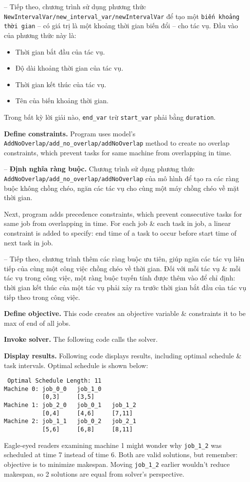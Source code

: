 \documentclass{article}
\begin{document}
-- Tiếp theo, chương trình sử dụng phương thức \verb|NewIntervalVar/new_interval_var/newIntervalVar| để tạo một {\tt biến khoảng thời gian} -- có giá trị là một khoảng thời gian biến đổi -- cho tác vụ. Đầu vào của phương thức này là:
\begin{itemize}
    \item Thời gian bắt đầu của tác vụ.
    \item Độ dài khoảng thời gian của tác vụ.
    \item Thời gian kết thúc của tác vụ.
    \item Tên của biến khoảng thời gian.
\end{itemize}
Trong bất kỳ lời giải nào, \verb|end_var| trừ \verb|start_var| phải bằng {\tt duration}.

{\bf Define constraints.} Program uses model's \verb|AddNoOverlap/add_no_overlap/addNoOverlap| method to create no overlap constraints, which prevent tasks for same machine from overlapping in time.

-- {\bf Định nghĩa ràng buộc.} Chương trình sử dụng phương thức \verb|AddNoOverlap/add_no_overlap/addNoOverlap| của mô hình để tạo ra các ràng buộc không chồng chéo, ngăn các tác vụ cho cùng một máy chồng chéo về mặt thời gian.

Next, program adds precedence constraints, which prevent consecutive tasks for same job from overlapping in time. For each job \& each task in job, a linear constraint is added to specify: end time of a task to occur before start time of next task in job.

-- Tiếp theo, chương trình thêm các ràng buộc ưu tiên, giúp ngăn các tác vụ liên tiếp của cùng một công việc chồng chéo về thời gian. Đối với mỗi tác vụ \& mỗi tác vụ trong công việc, một ràng buộc tuyến tính được thêm vào để chỉ định: thời gian kết thúc của một tác vụ phải xảy ra trước thời gian bắt đầu của tác vụ tiếp theo trong công việc.

{\bf Define objective.} This code creates an objective variable \& constraints it to be max of end of all jobs.

{\bf Invoke solver.} The following code calls the solver.

{\bf Display results.} Following code displays results, including optimal schedule \& task intervals. Optimal schedule is shown below:
\begin{verbatim}
 Optimal Schedule Length: 11
Machine 0: job_0_0   job_1_0
           [0,3]     [3,5]
Machine 1: job_2_0   job_0_1   job_1_2
           [0,4]     [4,6]     [7,11]
Machine 2: job_1_1   job_0_2   job_2_1
           [5,6]     [6,8]     [8,11]
\end{verbatim}
Eagle-eyed readers examining machine 1 might wonder why \verb|job_1_2| was scheduled at time 7 instead of time 6. Both are valid solutions, but remember: objective is to minimize makespan. Moving \verb|job_1_2| earlier wouldn't reduce makespan, so 2 solutions are equal from solver's perspective.
\end{document}
